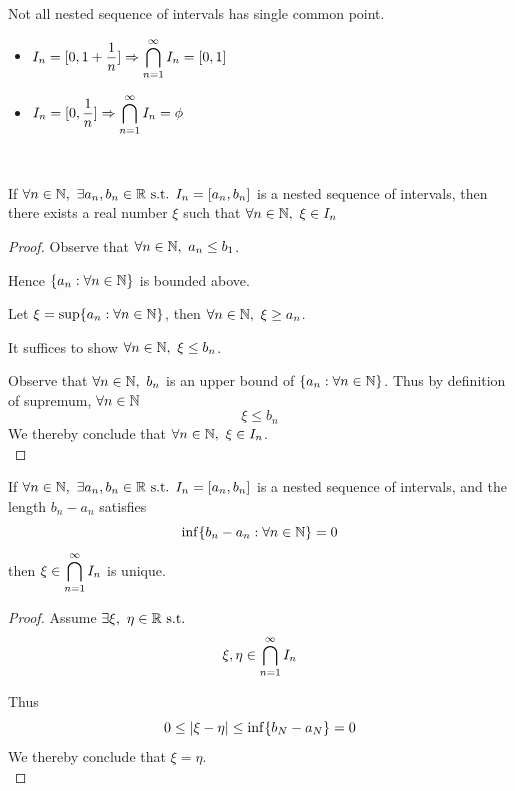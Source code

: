 \documentclass[a4paper,12pt]{article}
\begin{document}
\begin{remark}
    Not all nested sequence of intervals has single common point.
    \begin{itemize}
        \item \(I_n=[0,1+\dfrac{1}{n}]\Rightarrow\displaystyle\bigcap_{n=1}^{\infty}I_n=[0,1] \)
        \item \(I_n=[0,\dfrac{1}{n}]\Rightarrow\displaystyle\bigcap_{n=1}^{\infty}I_n=\phi \)\\
    \end{itemize}
\end{remark}

\begin{theorem}\ 

    If \(\forall n\in\mathbb{N},\ \exists a_n,b_n\in\mathbb{R}\text{ s.t. } I_n=[a_n,b_n]\) is a nested sequence of  intervals, 
    then there exists a real number \(\xi\) such that \(\forall n\in\N,\ \xi\in I_n\)
    \begin{proof}
        Observe that \(\forall n\in\mathbb{N},\ a_n\le b_1\).

        Hence \(\{a_n:\forall n\in\mathbb{N}\}\) is bounded above. 
        
        Let \(\xi=\sup\{a_n:\forall n\in\mathbb{N}\}\), then \(\forall n\in\N,\ \xi\ge a_n\). 

        It suffices to show \(\forall n\in\N,\ \xi\le b_n\).

        Observe that \(\forall n\in\mathbb{N},\ b_n\) is an upper bound of \(\{a_n:\forall n\in\mathbb{N}\}\). Thus by definition of supremum, \(\forall n\in\mathbb{N}\)
        \[\xi\le b_n\]
        We thereby conclude that \(\forall n\in\N,\ \xi\in I_n\).\\
    \end{proof}
\end{theorem}

\begin{theorem}
    If \(\forall n\in\mathbb{N},\ \exists a_n,b_n\in\mathbb{R}\text{ s.t. } I_n=[a_n,b_n]\) is a nested sequence of  intervals, 
    and the length \(b_n-a_n\) satisfies
    \[\inf\{b_n-a_n:\forall n\in\mathbb{N}\}=0\]
    then \(\xi\in\displaystyle\bigcap_{n=1}^{\infty}I_n\) is unique.
    \begin{proof}
        Assume \(\exists\xi,\ \eta\in\R\st\)
        \[\xi,\eta\in\displaystyle\bigcap_{n=1}^{\infty}I_n\]
        
        Thus 
        \[0\le\left\lvert \xi-\eta\right\rvert\le \inf\{b_N-a_N\}=0\]
        We thereby conclude that \(\xi=\eta\).\\
    \end{proof}
\end{theorem}
\end{document}
